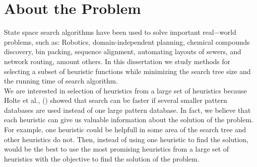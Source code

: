 

\chapter{About the Problem}\label{aboutTheProblem}

\iffalse
\chapterprecis{The purpose of this section if to motivate the problem.}\index{sinopse de capítulo}
\fi

State space search algorithms have been used to solve important real$-$world problems, such as: Robotics, domain-independent planning, chemical compounds discovery, bin packing, sequence alignment, automating layouts of sewers, and network routing, amount others. In this dissertation we study methods for selecting a subset of heuristic functions while minimizing the search tree size and the running time of search algorithm.\\

We are interested in selection of heuristics from a large set of heuristics because Holte et al., (\citeyear{holte2006maximizing}) showed that search can be faster if several smaller pattern databases are used instead of one large pattern database. In fact, we believe that each heuristic can give us valuable information about the solution of the problem. For example, one heuristic could be helpfull in some area of the search tree and other heuristics do not. Then, instead of using one heuristic to find the solution, would be the best to use the most promising heuristics from a large set of heuristics with the objective to find the solution of the problem.\\


